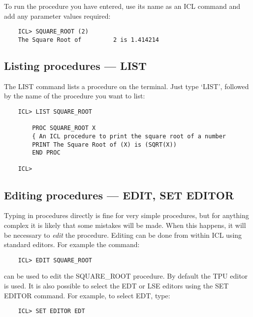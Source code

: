 To run the procedure you have entered, use its name as an ICL command and add
any parameter values required:

\begin{small}
\begin{verbatim}
    ICL> SQUARE_ROOT (2)
    The Square Root of         2 is 1.414214
\end{verbatim}
\end{small}

\subsection{Listing procedures --- LIST}

The LIST command lists a procedure on the terminal.
Just type `LIST', followed by the name of the procedure you want to list:

\begin{small}
\begin{verbatim}
    ICL> LIST SQUARE_ROOT

        PROC SQUARE_ROOT X
        { An ICL procedure to print the square root of a number
        PRINT The Square Root of (X) is (SQRT(X))
        END PROC

    ICL>
\end{verbatim}
\end{small}

\subsection{Editing procedures --- EDIT, SET EDITOR}

Typing in procedures directly is fine for very simple procedures, but for
anything complex it is likely that some mistakes will be made.
When this happens, it will be necessary to {\em edit} the procedure.
Editing can be done from within ICL using standard editors. 
For example the command:

\begin{small}
\begin{verbatim}
    ICL> EDIT SQUARE_ROOT
\end{verbatim}
\end{small}

can be used to edit the SQUARE\_ROOT procedure.
By default the TPU editor is used.
It is also possible to select the EDT or LSE editors using the SET EDITOR
command.
For example, to select EDT, type:

\begin{small}
\begin{verbatim}
    ICL> SET EDITOR EDT
\end{verbatim}
\end{small}

